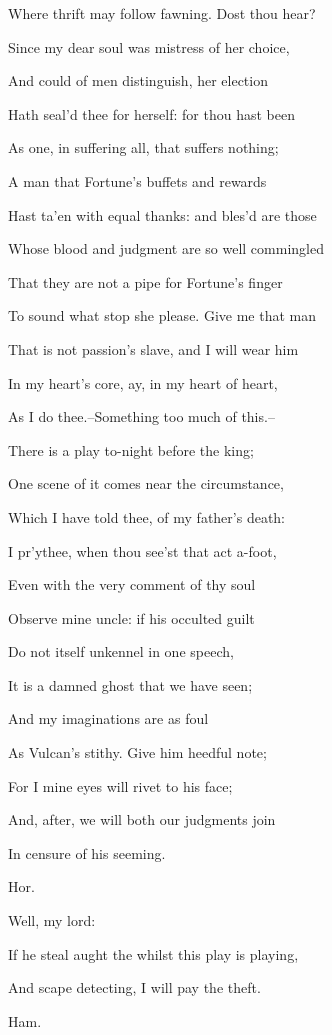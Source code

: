 \documentclass[12pt]{book}
\begin{document}
Where thrift may follow fawning. Dost thou hear?

Since my dear soul was mistress of her choice,

And could of men distinguish, her election

Hath seal'd thee for herself: for thou hast been

As one, in suffering all, that suffers nothing;

A man that Fortune's buffets and rewards

Hast ta'en with equal thanks: and bles'd are those

Whose blood and judgment are so well commingled

That they are not a pipe for Fortune's finger

To sound what stop she please. Give me that man

That is not passion's slave, and I will wear him

In my heart's core, ay, in my heart of heart,

As I do thee.--Something too much of this.--

There is a play to-night before the king;

One scene of it comes near the circumstance,

Which I have told thee, of my father's death:

I pr'ythee, when thou see'st that act a-foot,

Even with the very comment of thy soul

Observe mine uncle: if his occulted guilt

Do not itself unkennel in one speech,

It is a damned ghost that we have seen;

And my imaginations are as foul

As Vulcan's stithy. Give him heedful note;

For I mine eyes will rivet to his face;

And, after, we will both our judgments join

In censure of his seeming.



Hor.

Well, my lord:

If he steal aught the whilst this play is playing,

And scape detecting, I will pay the theft.



Ham.
\end{document}
